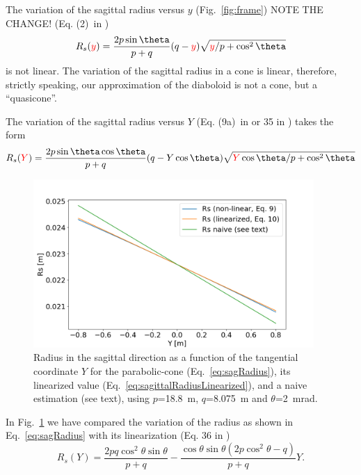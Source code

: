 \documentclass{iucr}              %
\newcommand{\inred}[1]{{\color{red}#1}}
\begin{document}
The variation of the sagittal radius versus \inred{$y$ (Fig.~\ref{fig:frame}) NOTE THE CHANGE!}  (Eq. (2)\ in \cite{Valeriy2020c} )
\begin{equation}
\label{eq:sagRadiusApprox}
R_s(\inred{y}) = \frac{2  p \sin\theta}{p + q} (q - \inred{y})   \sqrt{\inred{y} / p + \cos^2\theta}
\end{equation}
is not linear. The variation of the sagittal radius in a cone is linear, therefore, strictly speaking, our approximation of the diaboloid is not a cone\inred{, but a ``quasicone''}. 

\inred{The variation of the sagittal radius versus $Y$  (Eq. (9a)\ in \cite{Valeriy2020c} or 35 in \cite{part2}) takes the form
\begin{equation}
\label{eq:sagRadius}
R_s(\inred{Y}) = \frac{2  p \sin\theta \cos\theta}{p + q} (q - Y \cos\theta)   \sqrt{\inred{Y} \cos\theta / p + \cos^2\theta}
\end{equation}
}

\begin{figure}
\label{fig:sagittalRadius}
\centering
\includegraphics[width=0.95\textwidth]{figures/sagittalradius.png}
\caption{Radius in the sagittal direction as a function of the tangential coordinate $Y$ for the parabolic-cone (Eq.~\ref{eq:sagRadius}), its linearized value (Eq.~\ref{eq:sagittalRadiusLinearized}), and a naive estimation (see text), using $p$=18.8~m, $q$=8.075~m and $\theta$=2~mrad.
}
\end{figure}

In Fig.~\ref{fig:sagittalRadius} we have compared the variation of the radius as shown in Eq.~\ref{eq:sagRadius} with its linearization (Eq. 36 in \cite{part2})
\begin{equation}
\label{eq:sagittalRadiusLinearized}
R_s(Y) = \frac{2p q \cos^2\theta \sin\theta  }{p + q} - 
\frac{\cos\theta \sin\theta (2 p \cos^2\theta - q)}{p + q} Y.
\end{equation}
\end{document}
